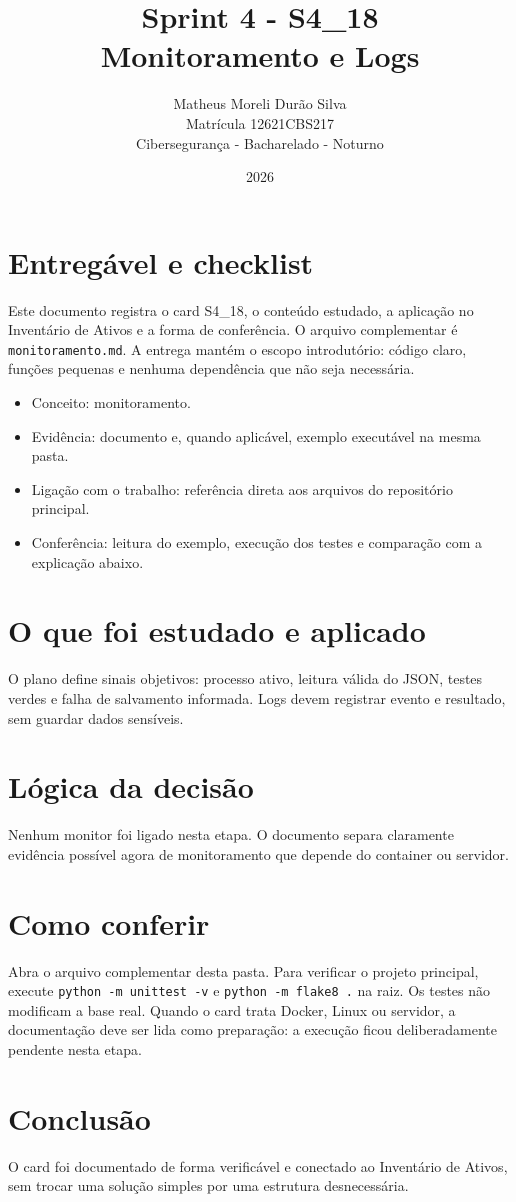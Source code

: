 \documentclass[12pt]{article}
\title{Sprint 4 - S4\_18\\Monitoramento e Logs}
\author{Matheus Moreli Durão Silva\\ Matrícula 12621CBS217\\ Cibersegurança - Bacharelado - Noturno}
\date{2026}
\begin{document}
\maketitle

\section*{Entregável e checklist}
Este documento registra o card S4\_18, o conteúdo estudado, a aplicação no Inventário de Ativos e a forma de conferência. O arquivo complementar é \texttt{monitoramento.md}. A entrega mantém o escopo introdutório: código claro, funções pequenas e nenhuma dependência que não seja necessária.

\begin{itemize}
\item Conceito: monitoramento.
\item Evidência: documento e, quando aplicável, exemplo executável na mesma pasta.
\item Ligação com o trabalho: referência direta aos arquivos do repositório principal.
\item Conferência: leitura do exemplo, execução dos testes e comparação com a explicação abaixo.
\end{itemize}

\section*{O que foi estudado e aplicado}
O plano define sinais objetivos: processo ativo, leitura válida do JSON, testes verdes e falha de salvamento informada. Logs devem registrar evento e resultado, sem guardar dados sensíveis.

\section*{Lógica da decisão}
Nenhum monitor foi ligado nesta etapa. O documento separa claramente evidência possível agora de monitoramento que depende do container ou servidor.

\section*{Como conferir}
Abra o arquivo complementar desta pasta. Para verificar o projeto principal, execute \texttt{python -m unittest -v} e \texttt{python -m flake8 .} na raiz. Os testes não modificam a base real. Quando o card trata Docker, Linux ou servidor, a documentação deve ser lida como preparação: a execução ficou deliberadamente pendente nesta etapa.

\section*{Conclusão}
O card foi documentado de forma verificável e conectado ao Inventário de Ativos, sem trocar uma solução simples por uma estrutura desnecessária.
\end{document}
